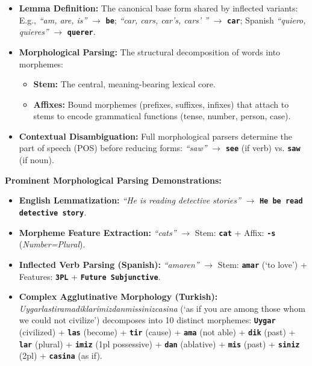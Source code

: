 \documentclass[10pt,a4paper]{article}
\newcommand{\rx}[1]{\texttt{\bfseries\color{inlinecode}#1}}
\begin{document}
\begin{itemize}[leftmargin=12pt, itemsep=1pt, parsep=0pt, topsep=0.5pt]
    \item \textbf{Lemma Definition:} The canonical base form shared by inflected variants:
    \newline E.g., \textit{``am, are, is''} $\longrightarrow$ \rx{be}; \quad \textit{``car, cars, car's, cars' ''} $\longrightarrow$ \rx{car}; \quad Spanish \textit{``quiero, quieres''} $\longrightarrow$ \rx{querer}.
    \item \textbf{Morphological Parsing:} The structural decomposition of words into morphemes:
    \begin{itemize}[leftmargin=10pt, itemsep=0.5pt]
        \item \textbf{Stem:} The central, meaning-bearing lexical core.
        \item \textbf{Affixes:} Bound morphemes (prefixes, suffixes, infixes) that attach to stems to encode grammatical functions (tense, number, person, case).
    \end{itemize}
    \item \textbf{Contextual Disambiguation:} Full morphological parsers determine the part of speech (POS) before reducing forms: \textit{``saw''} $\rightarrow$ \rx{see} (if verb) vs. \rx{saw} (if noun).
\end{itemize}

\vspace{-2pt}
\begin{examplebox}
\footnotesize
\textbf{Prominent Morphological Parsing Demonstrations:}
\begin{itemize}[leftmargin=12pt, itemsep=1.5pt, parsep=0pt, topsep=1pt]
    \item \textbf{English Lemmatization:} \textit{``He is reading detective stories''} $\longrightarrow$ \rx{He be read detective story}.
    \item \textbf{Morpheme Feature Extraction:} \textit{``cats''} $\longrightarrow$ Stem: \rx{cat} + Affix: \rx{-s} (\textit{Number=Plural}).
    \item \textbf{Inflected Verb Parsing (Spanish):} \textit{``amaren''} $\longrightarrow$ Stem: \rx{amar} (`to love') + Features: \rx{3PL} + \rx{Future Subjunctive}.
    \item \textbf{Complex Agglutinative Morphology (Turkish):} \textit{Uygarlastiramadiklarimizdanmissinizcasina} (`as if you are among those whom we could not civilize') decomposes into 10 distinct morphemes:
    \newline \rx{Uygar} (civilized) + \rx{las} (become) + \rx{tir} (cause) + \rx{ama} (not able) + \rx{dik} (past) + \rx{lar} (plural) + \rx{imiz} (1pl possessive) + \rx{dan} (ablative) + \rx{mis} (past) + \rx{siniz} (2pl) + \rx{casina} (as if).
\end{itemize}
\end{examplebox}
\end{document}
